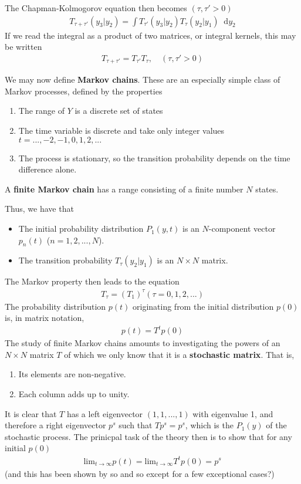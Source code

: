 \documentclass[twoside,english]{uiofysmaster}
\newcommand*\dif{\mathop{}\!\mathrm{d}}
\begin{document}
The Chapman-Kolmogorov equation then becomes $(\tau, \tau' > 0)$
\begin{align}
	T_{\tau+\tau'} (y_3 | y_2) = \int T_{\tau'} (y_3|y_2) T_\tau (y_2|y_1) \dif y_2
\end{align}
If we read the integral as a product of two matrices, or integral kernels, this may be written
\begin{align}
	T_{\tau + \tau'} = T_{\tau'} T_{\tau}, \quad (\tau, \tau' > 0)
\end{align}


We may now define \textbf{Markov chains}. These are an especially simple class of Markov processes, defined by the properties
\begin{enumerate}
	\item The range of $Y$ is a discrete set of states
	\item The time variable is discrete and take only integer values $t=...,-2,-1,0,1,2,...$
	\item The process is stationary, so the transition probability depends on the time difference alone.
\end{enumerate}
A \textbf{finite Markov chain} has a range consisting of a finite number $N$ states. 

Thus, we have that
\begin{itemize}
	\item The initial probability distribution $P_1 (y, t)$ is an $N$-component vector $p_n(t)$ ($n=1,2,...,N$).
	\item The transition probability $T_\tau (y_2|y_1)$ is an $N\times N$ matrix.
\end{itemize}

The Markov property then leads to the equation
\begin{align}
	T_\tau = (T_1)^{\tau} (\tau = 0,1,2,...)
\end{align}
The probability distribution $p(t)$ originating from the initial distribution $p(0)$ is, in matrix notation,
\begin{align}
	p(t) = T^t p(0)
\end{align}
The study of finite Markov chains amounts to investigating the powers of an $N\times N$ matrix $T$ of which we only know that it is a \textbf{stochastic matrix}. That is,
\begin{enumerate}
	\item Its elements are non-negative.
	\item Each column adds up to unity.
\end{enumerate}
It is clear that $T$ has a left eigenvector $(1,1,...,1)$ with eigenvalue 1, and therefore a right eigenvector $p^s$ such that $T p^s = p^s$, which is the $P_1(y)$ of the stochastic process.
The prinicpal task of the theory then is to show that for any initial $p(0)$
\begin{align}
	\text{lim}_{t\rightarrow \infty} p(t) = \text{lim}_{t\rightarrow \infty} T^t p(0) = p^s
\end{align}
(and this has been shown by so and so except for a few exceptional cases?)
\cite{VanKampen2007}
\end{document}
